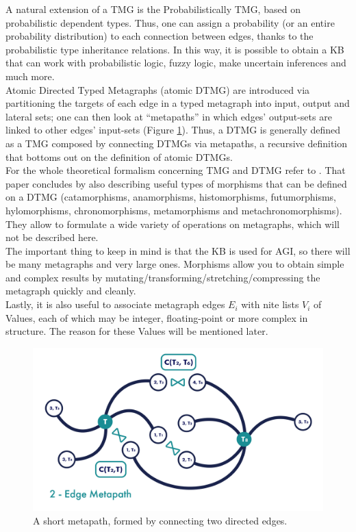 A natural extension of a TMG is the Probabilistically TMG, based on probabilistic dependent types. Thus, one can assign a probability (or an entire probability distribution) to each connection between edges, thanks to the probabilistic type inheritance relations. In this way, it is possible to obtain a KB that can work with probabilistic logic, fuzzy logic, make uncertain inferences and much more. \\
Atomic Directed Typed Metagraphs (atomic DTMG) are introduced via partitioning the targets of each edge in a typed metagraph into input, output and lateral sets; one can then look at \enquote{metapaths} in which edges' output-sets are linked to other edges' input-sets (Figure \ref{fig:typed_metapath}). Thus, a DTMG is generally defined as a TMG composed by connecting DTMGs via metapaths, a recursive definition that bottoms out on the definition of atomic DTMGs. \\
For the whole theoretical formalism concerning TMG and DTMG refer to \cite{DBLP:journals/corr/abs-2012-01759}. 
That paper concludes by also describing useful types of morphisms that can be defined on a DTMG (catamorphisms, anamorphisms, histomorphisms, futumorphisms, hylomorphisms, chrono\-morphisms, metamorphisms and metachronomorphisms). 
They allow to formulate a wide variety of operations on metagraphs, which will not be described here. \\
The important thing to keep in mind is that the KB is used for AGI, so there will be many metagraphs and very large ones. Morphisms allow you to obtain simple and complex results by mutating/transforming/stretching/compressing the metagraph quickly and cleanly. \\
Lastly, it is also useful to associate metagraph edges $E_{i}$ with nite lists $V_{i}$ of Values, each of which may be integer, floating-point or more complex in structure. The reason for these Values will be mentioned later.

\begin{figure}[h]
\centering
\includegraphics[width=0.65
\textwidth]{figures/Magistrale/typed_metapath}
\caption[Metapath]{A short metapath, formed by connecting two directed edges.
\label{fig:typed_metapath}}
\end{figure}


